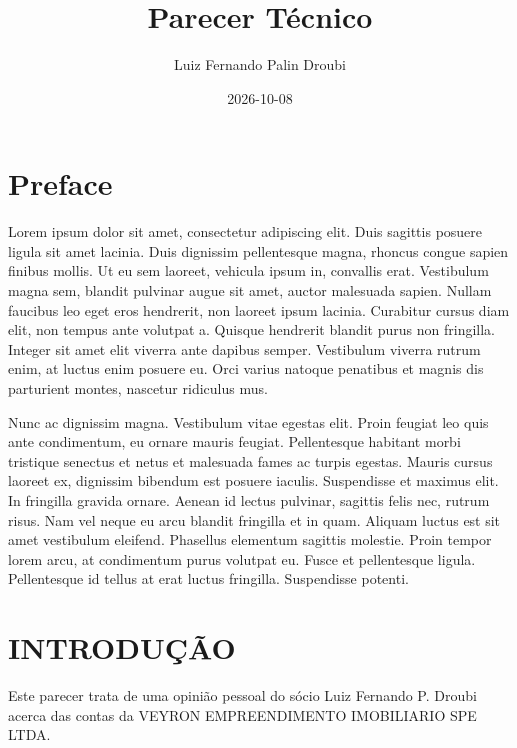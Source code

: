 \documentclass[
  letterpaper,
  DIV=11,
  numbers=noendperiod]{scrreprt}
\title{Parecer Técnico}
\author{Luiz Fernando Palin Droubi}
\date{2026-10-08}
\renewcommand*\contentsname{Table of contents}
\newcommand\contentsname{Table of contents}
\begin{document}
\maketitle

\renewcommand*\contentsname{Table of contents}
{
\hypersetup{linkcolor=}
\setcounter{tocdepth}{2}
\tableofcontents
}


\chapter*{Preface}\label{preface}


Lorem ipsum dolor sit amet, consectetur adipiscing elit. Duis sagittis
posuere ligula sit amet lacinia. Duis dignissim pellentesque magna,
rhoncus congue sapien finibus mollis. Ut eu sem laoreet, vehicula ipsum
in, convallis erat. Vestibulum magna sem, blandit pulvinar augue sit
amet, auctor malesuada sapien. Nullam faucibus leo eget eros hendrerit,
non laoreet ipsum lacinia. Curabitur cursus diam elit, non tempus ante
volutpat a. Quisque hendrerit blandit purus non fringilla. Integer sit
amet elit viverra ante dapibus semper. Vestibulum viverra rutrum enim,
at luctus enim posuere eu. Orci varius natoque penatibus et magnis dis
parturient montes, nascetur ridiculus mus.

Nunc ac dignissim magna. Vestibulum vitae egestas elit. Proin feugiat
leo quis ante condimentum, eu ornare mauris feugiat. Pellentesque
habitant morbi tristique senectus et netus et malesuada fames ac turpis
egestas. Mauris cursus laoreet ex, dignissim bibendum est posuere
iaculis. Suspendisse et maximus elit. In fringilla gravida ornare.
Aenean id lectus pulvinar, sagittis felis nec, rutrum risus. Nam vel
neque eu arcu blandit fringilla et in quam. Aliquam luctus est sit amet
vestibulum eleifend. Phasellus elementum sagittis molestie. Proin tempor
lorem arcu, at condimentum purus volutpat eu. Fusce et pellentesque
ligula. Pellentesque id tellus at erat luctus fringilla. Suspendisse
potenti.


\chapter{INTRODUÇÃO}\label{introduuxe7uxe3o}

Este parecer trata de uma opinião pessoal do sócio Luiz Fernando P.
Droubi acerca das contas da VEYRON EMPREENDIMENTO IMOBILIARIO SPE LTDA.
\end{document}
